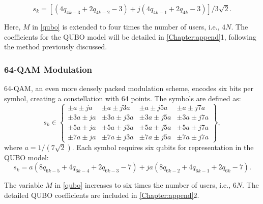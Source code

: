 \begin{equation}
    s_{k} = \left[\left(4q_{4k-3}+2q_{4k-2}-3\right) + j\left(4q_{4k-1}+2q_{4k}-3\right)\right]/3\sqrt{2}.
\end{equation}

\vspace{-0.3cm}
Here, $M$ in \eqref{qubo} is extended to four times the number of users, i.e., $4N$. The coefficients for the QUBO model will be detailed in \autoref{Chapter:append}1, following the method previously discussed.

\subsubsection{64-QAM Modulation}
64-QAM, an even more densely packed modulation scheme, encodes six bits per symbol, creating a constellation with 64 points. The symbols are defined as:
\[
s_{k} \in \left\lbrace 
\begin{array}{cccc}
	\pm a\pm ja & \pm a\pm j3a & \pm a\pm j5a & \pm a\pm j7a \\
	\pm 3a\pm ja & \pm 3a \pm j3a & \pm 3a\pm j5a & \pm 3a \pm j7a\\
	\pm 5a\pm ja & \pm 5a \pm j3a & \pm 5a\pm j5a & \pm 5a \pm j7a \\
	\pm 7a\pm ja & \pm 7a \pm j3a & \pm 7a\pm j5a & \pm 7a \pm j7a
	\end{array} \right\rbrace,
\]
where $a = 1/(7\sqrt{2})$. Each symbol requires six qubits for representation in the QUBO model:
\begin{equation}
s_{k} = a \left(8q_{6k-5}+4q_{6k-4}+2q_{6k-3}-7\right) + j a \left(8q_{6k-2}+4q_{6k-1}+2q_{6k}-7\right).
\end{equation}

The variable $M$ in \eqref{qubo} increases to six times the number of users, i.e., $6N$. The detailed QUBO coefficients are included in \autoref{Chapter:append}2.

